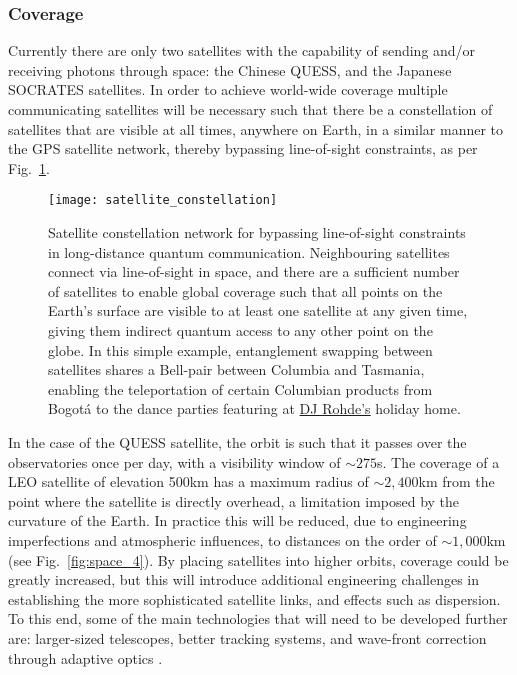 %
%

\subsubsection{Coverage}

Currently there are only two satellites with the capability of sending and/or receiving photons through space: the Chinese QUESS, and the Japanese SOCRATES satellites. In order to achieve world-wide coverage multiple communicating satellites will be necessary such that there be a constellation of satellites that are visible at all times, anywhere on Earth, in a similar manner to the GPS satellite network, thereby bypassing line-of-sight constraints, as per Fig.~\ref{fig:sat_constellation}.

\begin{figure}[!htb]
	\texttt{[image: satellite\_constellation]}
	\caption{Satellite constellation network for bypassing line-of-sight constraints in long-distance quantum communication. Neighbouring satellites connect via line-of-sight in space, and there are a sufficient number of satellites to enable global coverage such that all points on the Earth's surface are visible to at least one satellite at any given time, giving them indirect quantum access to any other point on the globe. In this simple example, entanglement swapping between satellites shares a Bell-pair between Columbia and Tasmania, enabling the teleportation of certain Columbian products from Bogot{\'a} to the dance parties featuring at \href{https://soundcloud.com/peter-rohde}{DJ Rohde's} holiday home.} \label{fig:sat_constellation}
\end{figure}

In the case of the QUESS satellite, the orbit is such that it passes over the observatories once per day, with a visibility window of $\sim 275$s. The coverage of a LEO satellite of elevation 500km has a maximum radius of $\sim 2,400$km from the point where the satellite is directly overhead, a limitation imposed by the curvature of the Earth. In practice this will be reduced, due to engineering imperfections and atmospheric influences, to distances on the order of $\sim 1,000$km (see Fig.~\ref{fig:space_4}). By placing satellites into higher orbits, coverage could be greatly increased, but this will introduce additional engineering challenges in establishing the more sophisticated satellite links, and effects such as dispersion. To this end, some of the main technologies that will need to be developed further are: larger-sized telescopes, better tracking systems, and wave-front correction through adaptive optics \cite{bib:liao2017satellite}.

